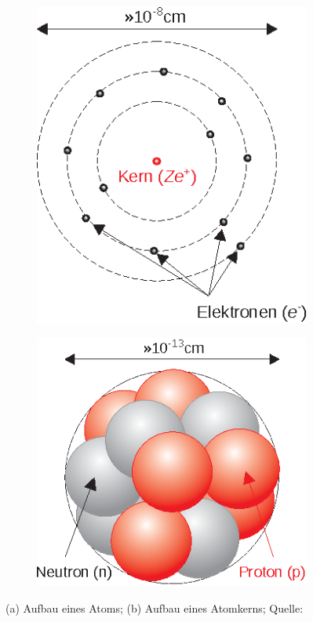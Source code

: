 \begin{figure}[ht]
\centering

\begin{subfigure}[b]{0.3\textwidth}
\includegraphics[width=\textwidth]{fig/i_01_atom.eps}
\caption{}
\label{fig:i_01_atom}
\end{subfigure}\qquad\qquad\qquad\qquad
\begin{subfigure}[b]{0.3\textwidth}
\includegraphics[width=\textwidth]{fig/i_02_kern.eps}
\caption{}
\label{fig:i_01_kern}
\end{subfigure}

\caption{(a) Aufbau eines Atoms; (b) Aufbau eines Atomkerns; Quelle: \cite[S. 507]{EKS07}}
\end{figure}

